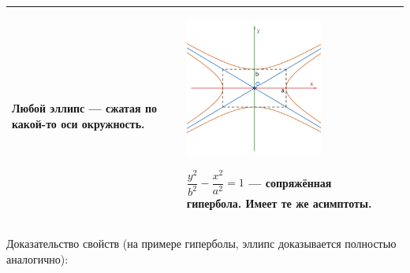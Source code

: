 \documentclass[twoside]{book}
\begin{document}
\begin{center}
\begin{longtable}{|p{2.5cm}|p{4.5cm}|p{4.5cm}|p{4.5cm}|}
        Любой эллипс --- сжатая по какой-то оси окружность.
         &
        \begin{center}
            \includegraphics[width=4.5cm]{Images/Chapter_1/3-1-20.png}
        \end{center}
        \(\dfrac{y^2}{b^2} - \dfrac{x^2}{a^2} = 1\) --- сопряжённая гипербола. Имеет те же асимптоты.
         &

        \\
        \hline
    \end{longtable}
\end{center}
Доказательство свойств (на примере гиперболы, эллипс доказывается полностью аналогично):
\end{document}
